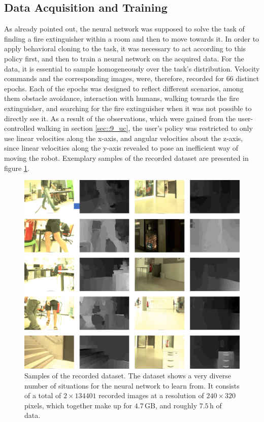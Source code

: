 \subsection{Data Acquisition and Training}
\label{sec::1111_da}
As already pointed out, the neural network was supposed to solve the task of finding a fire extinguisher within a room and then to move towards it. In order to apply behavioral cloning to the task, it was necessary to act according to this policy first, and then to train a neural network on the acquired data. For the data, it is essential to sample homogeneously over the task's distribution. Velocity commands and the corresponding images, were, therefore, recorded for 66 distinct epochs. Each of the epochs was designed to reflect different scenarios, among them obstacle avoidance, interaction with humans, walking towards the fire extinguisher, and searching for the fire extinguisher when it was not possible to directly see it. As a result of the observations, which were gained from the user-controlled walking in section \ref{sec::9_uc}, the user's policy was restricted to only use linear velocities along the x-axis, and angular velocities about the z-axis, since linear velocities along the y-axis revealed to pose an inefficient way of moving the robot. Exemplary samples of the recorded dataset are presented in figure \ref{fig::1111_dataset}.
\begin{figure}[h!]
	\centering
	\includegraphics[scale=.4]{chapters/11_autonomous_walking_experiments/img/dataset_diversity.png}
	\caption{Samples of the recorded dataset. The dataset shows a very diverse number of situations for the neural network to learn from. It consists of a total of $2\times134401$ recorded images at a resolution of $240\times320$ pixels, which together make up for $4.7\,\text{GB}$, and roughly $7.5\,\text{h}$ of data.}
	\label{fig::1111_dataset}
\end{figure}
